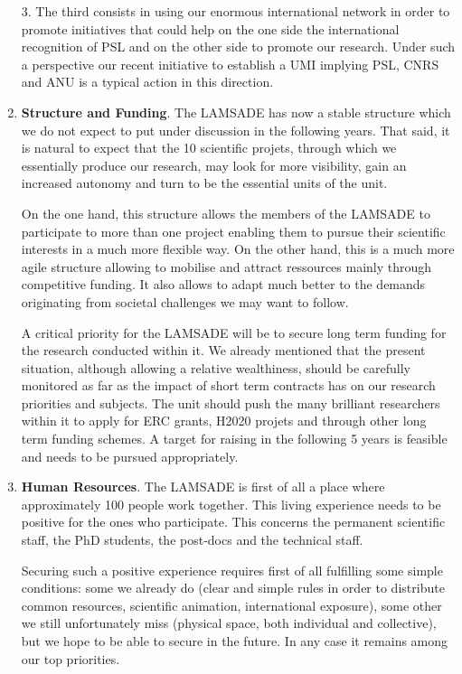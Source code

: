 \begin{enumerate}
      3. The third consists in using our enormous international network in order to promote initiatives that could help on the one side the international recognition of PSL and on the other side to promote our research. Under such a perspective our recent initiative to establish a UMI implying PSL, CNRS and ANU is a typical action in this direction.
  \item \textbf{Structure and Funding}. The LAMSADE has now a stable structure which we do not expect to put under discussion in the following years. That said, it is natural to expect that the 10 scientific projets, through which we essentially produce our research, may look for more visibility, gain an increased autonomy and turn to be the essential units of the unit.

      On the one hand, this structure allows the members of the LAMSADE to participate to more than one project enabling them to pursue their scientific interests in a much more flexible way. On the other hand, this is a much more agile structure allowing to mobilise and attract ressources mainly through competitive funding. It also allows to adapt much better to the demands originating from societal challenges we may want to follow.

      A critical priority for the LAMSADE will be to secure long term funding for the research conducted within it. We already mentioned that the present situation, although allowing a relative wealthiness, should be carefully monitored as far as the impact of short term contracts has on our research priorities and subjects. The unit should push the many brilliant researchers within it to apply for ERC grants, H2020 projets and through other long term funding schemes. A target for raising  in the following 5 years is feasible and needs to be pursued appropriately.
  \item \textbf{Human Resources}. The LAMSADE is first of all a place where approximately 100 people work together. This living experience needs to be positive for the ones who participate. This concerns the permanent scientific staff, the PhD students, the post-docs and the technical staff.

      Securing such a positive experience requires first of all fulfilling some simple conditions: some we already do (clear and simple rules in order to distribute common resources, scientific animation, international exposure), some other we still unfortunately miss (physical space, both individual and collective), but we hope to be able to secure in the future. In any case it remains among our top priorities.


\end{enumerate}
